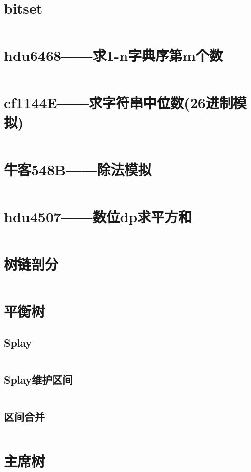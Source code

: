 \documentclass[a4paper,11pt]{article}
\begin{document}
\section*{bitset}
\inputminted[]{c++}{Template/Other/bitset.cpp}



\newpage
\section*{hdu6468——求1-n字典序第m个数}
\inputminted[]{c++}{Template/Other/hdu6468.cpp}
\section*{cf1144E——求字符串中位数(26进制模拟)}
\inputminted[]{c++}{Template/Other/cf1144E.cpp}
\section*{牛客548B——除法模拟}
\inputminted[]{c++}{Template/Other/548B.cpp}
\section*{hdu4507——数位dp求平方和}
\inputminted[]{c++}{Template/Other/hdu4507.cpp}

\newpage
\section*{树链剖分}
\inputminted[]{c++}{Template/DataStructure/TreeChainSplit.cpp}
\newpage
\section*{平衡树}
\subsection*{Splay}
\inputminted[]{c++}{Template/DataStructure/luoguP3369.cpp}
\subsection*{Splay维护区间}
\inputminted[]{c++}{Template/DataStructure/luoguP3391.cpp}

\newpage
\subsection*{区间合并}
\inputminted[]{c++}{Template/Segment/SegTreeIV.cpp}
\newpage
\section*{主席树}
\end{document}
